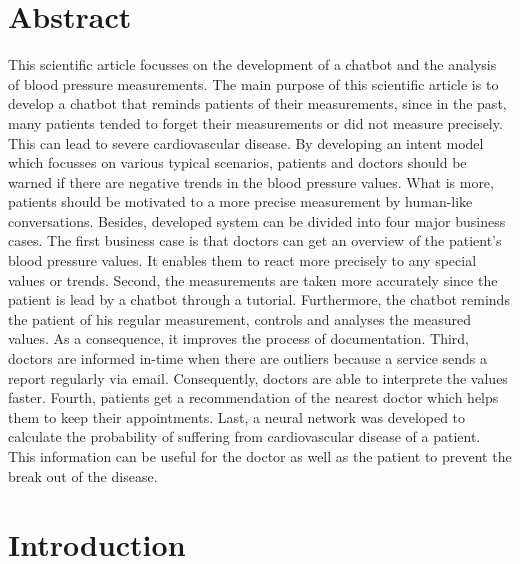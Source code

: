 



\chapter{Abstract}\label{abstract}

This scientific article focusses on the development of a chatbot and the analysis of blood pressure measurements.
The main purpose of this scientific article is to develop a chatbot that reminds patients of their measurements, since in the past, many patients tended to forget their measurements or did not measure precisely. This can lead to severe cardiovascular disease. By developing an intent model which focusses on various typical scenarios, patients and doctors should be warned if there are negative trends in the blood pressure values. What is more, patients should be motivated to a more precise measurement by human-like conversations.
Besides, developed system can be divided into four major business cases. 
The first business case is that doctors can get an overview of the patient's blood pressure values. It enables them to react more precisely to any special values or trends.
Second, the measurements are taken more accurately since the patient is lead by a chatbot through a tutorial. Furthermore, the chatbot reminds the patient of his regular measurement, controls and analyses the measured values. As a consequence, it improves the process of documentation.
Third, doctors are informed in-time when there are outliers because a service sends a report regularly via email. Consequently, doctors are able to interprete the values faster.
Fourth, patients get a recommendation of the nearest doctor which helps them to keep their appointments.
Last, a neural network was developed to calculate the probability of suffering from cardiovascular disease of a patient. This information can be useful for the doctor as well as the patient to prevent the break out of the disease.

\chapter{Introduction}\label{introduction}

